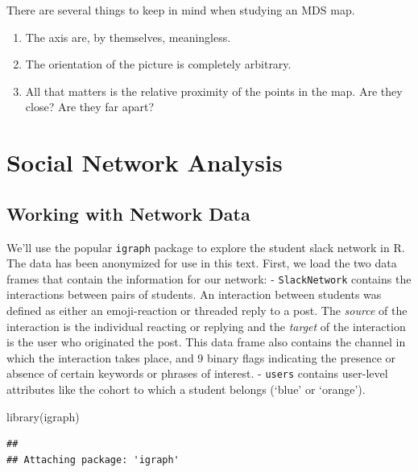\documentclass[
]{article}
\newenvironment{Shaded}{\begin{snugshade}}{\end{snugshade}}
\newcommand{\FunctionTok}[1]{\textcolor[rgb]{0.00,0.00,0.00}{#1}}
\newcommand{\NormalTok}[1]{#1}
\providecommand{\tightlist}{%
  \setlength{\itemsep}{0pt}\setlength{\parskip}{0pt}}
\theoremstyle{definition}
\theoremstyle{definition}
\theoremstyle{definition}
\theoremstyle{definition}
\theoremstyle{remark}
\begin{document}
There are several things to keep in mind when studying an MDS map.

\begin{enumerate}
\def\labelenumi{\arabic{enumi}.}
\tightlist
\item
  The axis are, by themselves, meaningless.
\item
  The orientation of the picture is completely arbitrary.
\item
  All that matters is the relative proximity of the points in the map. Are they close? Are they far apart?
\end{enumerate}

\hypertarget{sna}{%
\section{Social Network Analysis}\label{sna}}

\hypertarget{working-with-network-data}{%
\subsection{Working with Network Data}\label{working-with-network-data}}

We'll use the popular \texttt{igraph} package to explore the student slack network in R. The data has been anonymized for use in this text. First, we load the two data frames that contain the information for our network:
- \texttt{SlackNetwork} contains the interactions between pairs of students. An interaction between students was defined as either an emoji-reaction or threaded reply to a post. The \emph{source} of the interaction is the individual reacting or replying and the \emph{target} of the interaction is the user who originated the post. This data frame also contains the channel in which the interaction takes place, and 9 binary flags indicating the presence or absence of certain keywords or phrases of interest.
- \texttt{users} contains user-level attributes like the cohort to which a student belongs (`blue' or `orange').

\begin{Shaded}
\begin{Highlighting}[]
\FunctionTok{library}\NormalTok{(igraph)}
\end{Highlighting}
\end{Shaded}

\begin{verbatim}
## 
## Attaching package: 'igraph'
\end{verbatim}
\end{document}
